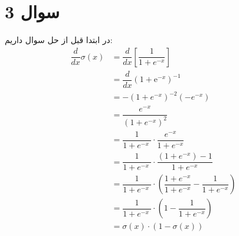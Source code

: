 \section*{سوال 3}

\noindent
در ابتدا قبل از حل سوال داریم:
\begin{align*}
    \dfrac{d}{dx} \sigma(x) &= \dfrac{d}{dx} \left[ \dfrac{1}{1 + e^{-x}} \right] \\
    &= \dfrac{d}{dx} \left( 1 + \mathrm{e}^{-x} \right)^{-1} \\
    &= -(1 + e^{-x})^{-2}(-e^{-x}) \\
    &= \dfrac{e^{-x}}{\left(1 + e^{-x}\right)^2} \\
    &= \dfrac{1}{1 + e^{-x}\ } \cdot \dfrac{e^{-x}}{1 + e^{-x}}  \\
    &= \dfrac{1}{1 + e^{-x}\ } \cdot \dfrac{(1 + e^{-x}) - 1}{1 + e^{-x}}  \\
    &= \dfrac{1}{1 + e^{-x}\ } \cdot \left( \dfrac{1 + e^{-x}}{1 + e^{-x}} - \dfrac{1}{1 + e^{-x}} \right) \\
    &= \dfrac{1}{1 + e^{-x}\ } \cdot \left( 1 - \dfrac{1}{1 + e^{-x}} \right) \\
    &= \sigma(x) \cdot (1 - \sigma(x))
\end{align*}
